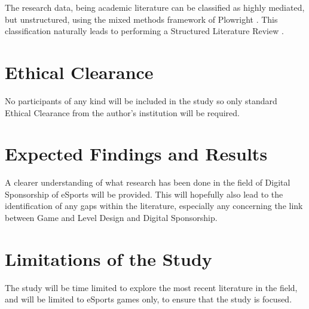 \documentclass[10pt,twoside]{article}
\begin{document}
The research data, being academic literature can be classified as highly mediated, but unstructured, using the mixed methods framework of Plowright \cite{plowright2011using}. This classification naturally leads to performing a Structured Literature Review \cite{petticrew2008systematic}.

\section{Ethical Clearance}
No participants of any kind will be included in the study so only standard Ethical Clearance from the author's institution will be required.

\section{Expected Findings and Results}
A clearer understanding of what research has been done in the field of Digital Sponsorship of eSports will be provided. This will hopefully also lead to the identification of any gaps within the literature, especially any concerning the link between Game and Level Design and Digital Sponsorship.

\section{Limitations of the Study}
The study will be time limited to explore the most recent literature in the field, and will be limited to eSports games only, to ensure that the study is focused.



\end{document}
